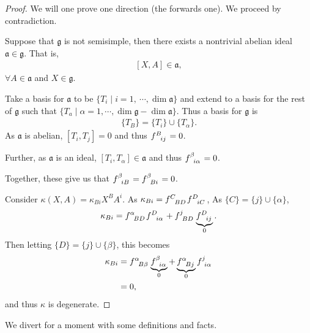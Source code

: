 \begin{proof}
    We will one prove one direction (the forwards one). We proceed by contradiction.

    Suppose that $\mathfrak{g}$ is not semisimple, then there exists a nontrivial abelian ideal $\mathfrak{a} \in \mathfrak{g}$. That is,
    \begin{align}
        \left[ X, A \right] \in \mathfrak{a}
    ,\end{align}
    $\forall A \in \mathfrak{a}$ and $X \in \mathfrak{g}$.

    Take a basis for $\mathfrak{a}$ to be $\{T_i  \mid i = 1,~ \cdots, \dim \mathfrak{a}\} $ and extend to a basis for the rest of $\mathfrak{g}$ such that $\{T_a  \mid  \alpha = 1, \cdots, \dim \mathfrak{g} - \dim \mathfrak{a}\} $. Thus a basis for $\mathfrak{g}$ is
    \begin{align}
        \{T_B\} = \{T_i\} \cup \{T_\alpha\} 
    .\end{align}
    As $\mathfrak{a}$ is abelian, $\left[ T_i, T_j \right] = 0$ and thus $\tensor{f}{^{B}_{ij}} = 0 $.
    
    Further, as $\mathfrak{a}$ is an ideal, $\left[ T_{i}, T_\alpha \right] \in \mathfrak{a}$ and thus $\tensor{f}{^{\beta}_{i\alpha}} = 0$.

    Together, these give us that $\tensor{f}{^{\beta}_{iB}} = \tensor{f}{^{\beta}_{Bi}} = 0$.

    Consider $\kappa \left( X,A \right) = \kappa_{Bi} X^{B} A^{i}$. As $\kappa_{Bi} = \tensor{f}{^{C}_{BD}} \tensor{f}{^{D}_{iC}}$, As $\{C\} = \{j\} \cup \{\alpha\} $,
    \begin{align}
        \kappa_{Bi} = \tensor{f}{^{\alpha}_{BD}} \tensor{f}{^{D}_{i\alpha}} + \tensor{f}{^{j}_{BD}} \underbrace{\tensor{f}{^{D}_{ij}}}_{0}
    .\end{align}
    Then letting $\{D\}  = \{j\}  \cup \{\beta\} $, this becomes
    \begin{align}
        \kappa_{Bi} &= \tensor{f}{^{\alpha}_{B\beta}} \underbrace{\tensor{f}{^{\beta}_{i\alpha}}}_{0} + \underbrace{\tensor{f}{^{\alpha}_{B j}}}_{0} \tensor{f}{^{j}_{i\alpha}} \\
        &= 0 
    ,\end{align}
    and thus $\kappa$ is degenerate.
    
\end{proof}

We divert for a moment with some definitions and facts.

